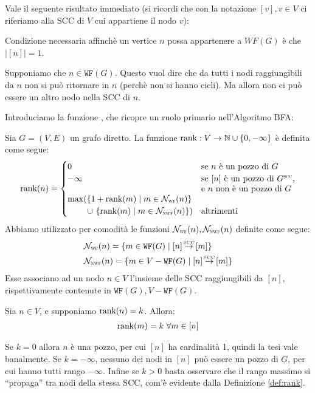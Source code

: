 Vale il seguente risultato immediato (si ricordi che con la notazione $[v], v \in V$ ci riferiamo alla SCC di $V$ cui appartiene il nodo $v$):
\begin{observation}
    Condizione necessaria affinchè un vertice $n$ possa appartenere a $WF(G)$ è che $|[n]| = 1$.
\end{observation}
\begin{proof2}
    Supponiamo che $n \in \texttt{WF}(G)$. Questo vuol dire che da tutti i nodi raggiungibili da $n$ non si può ritornare in $n$ (perchè non si hanno cicli). Ma allora non ci può essere un altro nodo nella SCC di $n$.
\end{proof2}

Introduciamo la funzione \rankfunc, che ricopre un ruolo primario nell'Algoritmo BFA:
\begin{definition}
    \label{def:rank}
    Sia $G = (V,E)$ un grafo diretto. La funzione $\textup{rank}: V \to \mathbb{N} \cup \{0, -\infty\}$ è definita come segue:
    \begin{gather*}
        \rankfunc(n) = \begin{cases}
            0 &\text{se $n$ è un pozzo di $G$}\\
            -\infty &\parbox[t]{.32\textwidth}{se $[n]$ è un pozzo di $G^{\scalebox{.5}{SCC}}$,
                        e $n$ non è un pozzo di $G$}\\
            \max(\{1 + \rankfunc(m) \mid m \in \mathcal{N_{\scalebox{0.5}{WF}}}(n)\}\\
            \,\,\,\,\,\,\,\,\,\,\,\,\,\, \cup \,\, \{\rankfunc(m) \mid m \in \mathcal{N_{\scalebox{0.5}{NWF}}}(n)\}) &\text{altrimenti}
        \end{cases}
    \end{gather*}
    Abbiamo utilizzato per comodità le funzioni $\mathcal{N}_{\scalebox{0.5}{WF}}(n), \mathcal{N}_{\scalebox{0.5}{NWF}}(n)$ definite come segue:
    \begin{align*}
        &\mathcal{N}_{\scalebox{0.5}{WF}}(n) = \{m \in \texttt{WF}(G) \mid [n] \sccto [m]\}\\
        &\mathcal{N}_{\scalebox{0.5}{NWF}}(n) = \{m \in V - \texttt{WF}(G) \mid [n] \sccto [m]\}
    \end{align*}
    Esse associano ad un nodo $n \in V$ l'insieme delle SCC raggiungibili da $[n]$, rispettivamente contenute in $\texttt{WF}(G), V - \texttt{WF}(G)$.
\end{definition}
\begin{observation}
    Sia $n \in V$, e supponiamo $\textup{rank}(n) = k$. Allora:
    \begin{gather*}
        \textup{rank}(m) = k \,\,\forall m \in [n]
    \end{gather*}
\end{observation}
\begin{proof2}
    Se $k = 0$ allora $n$ è una pozzo, per cui $[n]$ ha cardinalità 1, quindi la tesi vale banalmente. Se $k = -\infty$, nessuno dei nodi in $[n]$ può essere un pozzo di $G$, per cui hanno tutti rango $-\infty$. Infine se $k > 0$ basta osservare che il rango massimo si ``propaga'' tra nodi della stessa SCC, com'è evidente dalla Definizione \ref{def:rank}.
\end{proof2}

